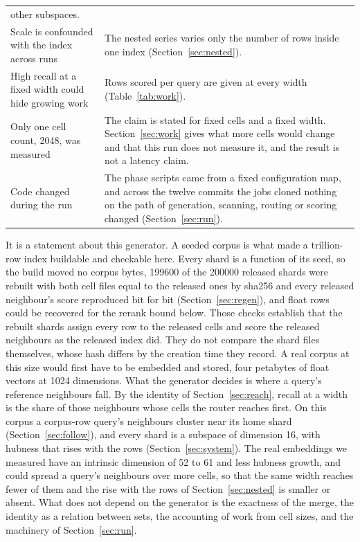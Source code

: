 \documentclass[sigconf, nonacm]{acmart}
\begin{document}
\begin{table}[t]
\begin{tabular}{p{}p{}}
other subspaces. \\
Scale is confounded with the index across runs &
The nested series varies only the number of rows inside one index (Section~\ref{sec:nested}). \\
High recall at a fixed width could hide growing work &
Rows scored per query are given at every width (Table~\ref{tab:work}). \\
Only one cell count, 2048, was measured &
The claim is stated for fixed cells and a fixed width. Section~\ref{sec:work} gives what more cells
would change and that this run does not measure it, and the result is not a latency claim. \\
Code changed during the run &
The phase scripts came from a fixed configuration map, and across the twelve commits the jobs
cloned nothing on the path of generation, scanning, routing or scoring changed
(Section~\ref{sec:run}). \\
\bottomrule
\end{tabular}
\end{table}

It is a statement about this generator. A seeded corpus is what made a trillion-row index
buildable and checkable here. Every shard is a function of its seed, so the build moved no corpus
bytes, 199600 of the 200000 released shards were rebuilt with both cell files equal to the
released ones by sha256 and every released neighbour's score reproduced bit for bit
(Section~\ref{sec:regen}), and float rows could be recovered for the rerank bound below. Those
checks establish that the rebuilt shards assign every row to the released cells and score the
released neighbours as the released index did. They do not compare the shard files themselves,
whose hash differs by the creation time they record. A real corpus at this size would
first have to be embedded and stored, four petabytes of float vectors at 1024 dimensions. What the
generator decides is where a query's reference neighbours fall. By the identity of
Section~\ref{sec:reach}, recall at a width is the share of those neighbours whose cells the router
reaches first. On this corpus a corpus-row query's neighbours cluster near its home shard
(Section~\ref{sec:follow}), and every shard is a subspace of dimension 16, with hubness that rises
with the rows (Section~\ref{sec:system}). The real embeddings we measured have an intrinsic
dimension of 52 to 61 and less hubness growth, and could spread a query's neighbours over more cells, so that the same width
reaches fewer of them and the rise with the rows of Section~\ref{sec:nested} is smaller or absent.
What does not depend on the generator is the exactness of the merge, the identity as a relation
between sets, the accounting of work from cell sizes, and the machinery of Section~\ref{sec:run}.
\end{document}

